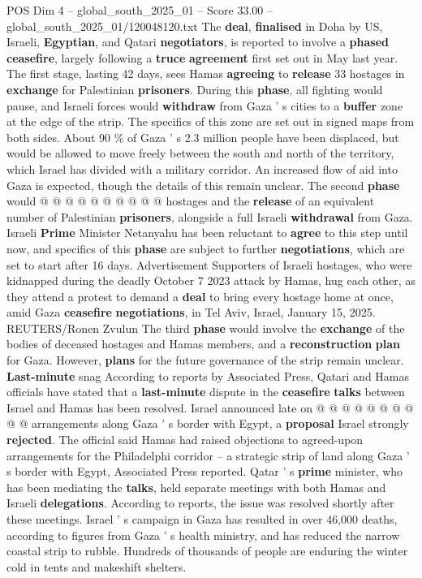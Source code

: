\begin{textsample}{POS Dim 4 – global\_south\_2025\_01 – Score 33.00 – global\_south\_2025\_01/120048120.txt}
The \textbf{deal}, \textbf{finalised} in Doha by US, Israeli, \textbf{Egyptian}, and Qatari \textbf{negotiators}, is reported to involve a \textbf{phased} \textbf{ceasefire}, largely following a \textbf{truce} \textbf{agreement} first set out in May last year.
The first stage, lasting 42 days, sees Hamas \textbf{agreeing} to \textbf{release} 33 hostages in \textbf{exchange} for Palestinian \textbf{prisoners}.
During this \textbf{phase}, all fighting would pause, and Israeli forces would \textbf{withdraw} from Gaza ' s cities to a \textbf{buffer} zone at the edge of the strip.
The specifics of this zone are set out in signed maps from both sides.
About 90 \% of Gaza ' s 2.3 million people have been displaced, but would be allowed to move freely between the south and north of the territory, which Israel has divided with a military corridor.
An increased flow of aid into Gaza is expected, though the details of this remain unclear.
The second \textbf{phase} would @ @ @ @ @ @ @ @ @ @ hostages and the \textbf{release} of an equivalent number of Palestinian \textbf{prisoners}, alongside a full Israeli \textbf{withdrawal} from Gaza.
Israeli \textbf{Prime} Minister Netanyahu has been reluctant to \textbf{agree} to this step until now, and specifics of this \textbf{phase} are subject to further \textbf{negotiations}, which are set to start after 16 days.
Advertisement Supporters of Israeli hostages, who were kidnapped during the deadly October 7 2023 attack by Hamas, hug each other, as they attend a protest to demand a \textbf{deal} to bring every hostage home at once, amid Gaza \textbf{ceasefire} \textbf{negotiations}, in Tel Aviv, Israel, January 15, 2025.
REUTERS/Ronen Zvulun The third \textbf{phase} would involve the \textbf{exchange} of the bodies of deceased hostages and Hamas members, and a \textbf{reconstruction} \textbf{plan} for Gaza.
However, \textbf{plans} for the future governance of the strip remain unclear. \textbf{Last-minute} snag According to reports by Associated Press, Qatari and Hamas officials have stated that a \textbf{last-minute} dispute in the \textbf{ceasefire} \textbf{talks} between Israel and Hamas has been resolved.
Israel announced late on @ @ @ @ @ @ @ @ @ @ arrangements along Gaza ' s border with Egypt, a \textbf{proposal} Israel strongly \textbf{rejected}.
The official said Hamas had raised objections to agreed-upon arrangements for the Philadelphi corridor -- a strategic strip of land along Gaza ' s border with Egypt, Associated Press reported.
Qatar ' s \textbf{prime} minister, who has been mediating the \textbf{talks}, held separate meetings with both Hamas and Israeli \textbf{delegations}.
According to reports, the issue was resolved shortly after these meetings.
Israel ' s campaign in Gaza has resulted in over 46,000 deaths, according to figures from Gaza ' s health ministry, and has reduced the narrow coastal strip to rubble.
Hundreds of thousands of people are enduring the winter cold in tents and makeshift shelters.


\end{textsample}
